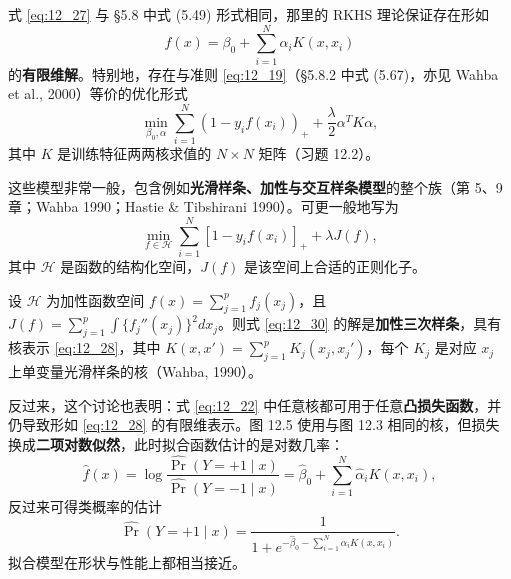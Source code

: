 \begin{remark}[有限维表示]
式 \ref{eq:12_27} 与 §5.8 中式 (5.49) 形式相同，那里的 RKHS 理论保证存在形如
\begin{equation}
f(x) = \beta_0 + \sum_{i=1}^{N}\alpha_i K(x,x_i) \label{eq:12_28}
\end{equation}
的\textbf{有限维解}。特别地，存在与准则 \ref{eq:12_19}（§5.8.2 中式 (5.67)，亦见 Wahba et al., 2000）等价的优化形式
\begin{equation}
\min_{\beta_0,\alpha} \sum_{i=1}^{N}(1 - y_i f(x_i))_+ + \frac{\lambda}{2}\alpha^T K \alpha, \label{eq:12_29}
\end{equation}
其中 $K$ 是训练特征两两核求值的 $N\times N$ 矩阵（习题 12.2）。
\end{remark}

这些模型非常一般，包含例如\textbf{光滑样条、加性与交互样条模型}的整个族（第 5、9 章；Wahba 1990；Hastie \& Tibshirani 1990）。可更一般地写为
\begin{equation}
\min_{f\in\mathcal{H}} \sum_{i=1}^{N}[1 - y_i f(x_i)]_+ + \lambda J(f), \label{eq:12_30}
\end{equation}
其中 $\mathcal{H}$ 是函数的结构化空间，$J(f)$ 是该空间上合适的正则化子。

\begin{example}[加性三次样条]
设 $\mathcal{H}$ 为加性函数空间 $f(x)=\sum_{j=1}^{p}f_j(x_j)$，且 $J(f)=\sum_{j=1}^{p}\int\{f_j''(x_j)\}^2 dx_j$。则式 \ref{eq:12_30} 的解是\textbf{加性三次样条}，具有核表示 \ref{eq:12_28}，其中 $K(x,x')=\sum_{j=1}^{p}K_j(x_j,x_j')$，每个 $K_j$ 是对应 $x_j$ 上单变量光滑样条的核（Wahba, 1990）。
\end{example}

\begin{remark}[核与损失的通用搭配]
反过来，这个讨论也表明：式 \ref{eq:12_22} 中任意核都可用于任意\textbf{凸损失函数}，并仍导致形如 \ref{eq:12_28} 的有限维表示。图 12.5 使用与图 12.3 相同的核，但损失换成\textbf{二项对数似然}，此时拟合函数估计的是对数几率：
\begin{equation}
\hat f(x) = \log\frac{\hat\Pr(Y=+1\mid x)}{\hat\Pr(Y=-1\mid x)} = \hat\beta_0 + \sum_{i=1}^{N}\hat\alpha_i K(x,x_i), \label{eq:12_31}
\end{equation}
反过来可得类概率的估计
\begin{equation}
\hat\Pr(Y=+1\mid x) = \frac{1}{1 + e^{-\hat\beta_0 - \sum_{i=1}^{N}\hat\alpha_i K(x,x_i)}}. \label{eq:12_32}
\end{equation}
拟合模型在形状与性能上都相当接近。
\end{remark}

